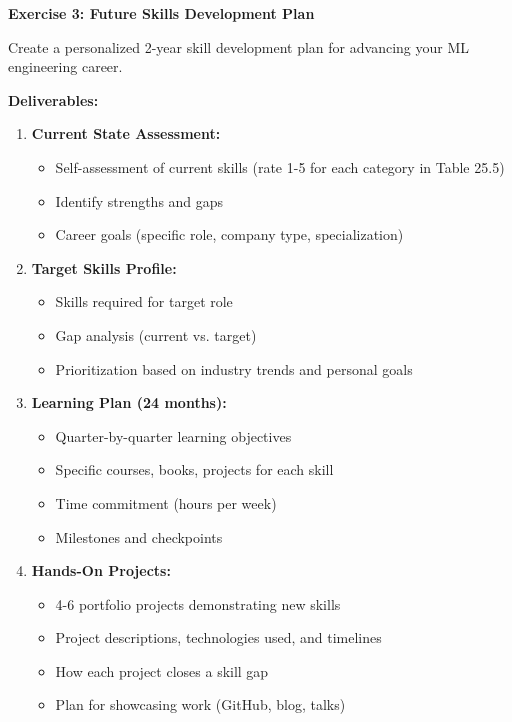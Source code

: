 \begin{exercise}
\textbf{Exercise 3: Future Skills Development Plan}

Create a personalized 2-year skill development plan for advancing your ML engineering career.

\textbf{Deliverables:}
\begin{enumerate}
    \item \textbf{Current State Assessment:}
    \begin{itemize}
        \item Self-assessment of current skills (rate 1-5 for each category in Table 25.5)
        \item Identify strengths and gaps
        \item Career goals (specific role, company type, specialization)
    \end{itemize}

    \item \textbf{Target Skills Profile:}
    \begin{itemize}
        \item Skills required for target role
        \item Gap analysis (current vs. target)
        \item Prioritization based on industry trends and personal goals
    \end{itemize}

    \item \textbf{Learning Plan (24 months):}
    \begin{itemize}
        \item Quarter-by-quarter learning objectives
        \item Specific courses, books, projects for each skill
        \item Time commitment (hours per week)
        \item Milestones and checkpoints
    \end{itemize}

    \item \textbf{Hands-On Projects:}
    \begin{itemize}
        \item 4-6 portfolio projects demonstrating new skills
        \item Project descriptions, technologies used, and timelines
        \item How each project closes a skill gap
        \item Plan for showcasing work (GitHub, blog, talks)
    \end{itemize}


\end{enumerate}
\end{exercise}
